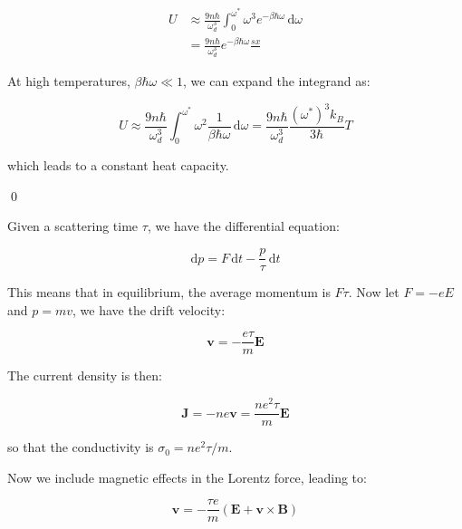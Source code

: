 \documentclass[12pt]{article}
\begin{document}
\begin{equation}
    \begin{split}
        U &\approx \frac{9n\hbar}{\omega_{d}^{3}} \int_{0}^{\omega^{*}} \omega^{3} e^{-\beta \hbar \omega} \, \mathrm{d}\omega \\
        &= \frac{9n\hbar}{\omega_{d}^{3}} e^{-\beta \hbar \omega} \frac{sx   }{}
    \end{split}
\end{equation}


At high temperatures, $\beta \hbar \omega \ll 1$, we can expand the integrand as:

\begin{equation}
    U \approx \frac{9n\hbar}{\omega_{d}^{3}} \int_{0}^{\omega^{*}} \omega^{2} \frac{1}{\beta \hbar \omega} \, \mathrm{d}\omega = \frac{9n\hbar}{\omega_{d}^{3}} \frac{(\omega^{*})^{3} k_{B}}{3\hbar} T
\end{equation}

which leads to a constant heat capacity.



\qed



Given a scattering time $\tau$, we have the differential equation:

\begin{equation}
    \mathrm{d}p = F \, \mathrm{d}t -\frac{p}{\tau} \, \mathrm{d}t
\end{equation}

This means that in equilibrium, the average momentum is $F\tau$. Now let $F = -eE$ and $p = mv$, we have the drift velocity:

\begin{equation}
    \mathbf{v} = -\frac{e\tau}{m} \mathbf{E}
\end{equation}

The current density is then:

\begin{equation}
    \mathbf{J} = -ne\mathbf{v} = \frac{ne^{2}\tau}{m} \mathbf{E}
\end{equation}

so that the conductivity is $\sigma_{0} = ne^{2}\tau/m$.

Now we include magnetic effects in the Lorentz force, leading to:

\begin{equation}
    \mathbf{v} = -\frac{\tau e}{m} \left( \mathbf{E} + \mathbf{v} \times \mathbf{B} \right)
\end{equation}
\end{document}
